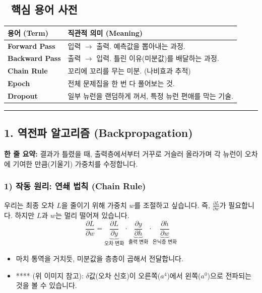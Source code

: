 \documentclass[11pt,a4paper]{book}
\theoremstyle{definition}
\begin{document}
\subsection*{📝 핵심 용어 사전}
\begin{table}[h]
\centering
\begin{tabularx}{\textwidth}{|p{}|X|}
\hline
\textbf{용어 (Term)} & \textbf{직관적 의미 (Meaning)} \\
\hline
\textbf{Forward Pass} & 입력 $\to$ 출력. 예측값을 뽑아내는 과정. \\
\hline
\textbf{Backward Pass} & 출력 $\to$ 입력. 틀린 이유(미분값)를 배달하는 과정. \\
\hline
\textbf{Chain Rule} & 꼬리에 꼬리를 무는 미분. (나비효과 추적) \\
\hline
\textbf{Epoch} & 전체 문제집을 한 번 다 풀어보는 것. \\
\hline
\textbf{Dropout} & 일부 뉴런을 랜덤하게 꺼서, 특정 뉴런 편애를 막는 기술. \\
\hline
\end{tabularx}
\end{table}

\vspace{0.5cm}\hrule\vspace{0.5cm}

\subsection{1. 역전파 알고리즘 (Backpropagation)}

\begin{conceptbox}[title={개념 1: 책임 소재 따지기 (The Blame Game)}]
\textbf{한 줄 요약:} 결과가 틀렸을 때, 출력층에서부터 거꾸로 거슬러 올라가며 각 뉴런이 오차에 기여한 만큼(기울기) 가중치를 수정합니다.
\end{conceptbox}

\subsubsection*{1) 작동 원리: 연쇄 법칙 (Chain Rule)}
우리는 최종 오차 $L$을 줄이기 위해 가중치 $w$를 조절하고 싶습니다. 즉, $\frac{\partial L}{\partial w}$가 필요합니다. 하지만 $L$과 $w$는 멀리 떨어져 있습니다.
$$ \frac{\partial L}{\partial w} = \underbrace{\frac{\partial L}{\partial y}}_{\text{오차 변화}} \cdot \underbrace{\frac{\partial y}{\partial h}}_{\text{출력 변화}} \cdot \underbrace{\frac{\partial h}{\partial w}}_{\text{은닉층 변화}} $$
\begin{itemize}
    \item 마치 통역을 거치듯, 미분값을 층층이 곱해서 전달합니다.
    \item **** (위 이미지 참고): $\delta$값(오차 신호)이 오른쪽($a^4$)에서 왼쪽($a^0$)으로 전파되는 것을 볼 수 있습니다.
\end{itemize}
\end{document}
